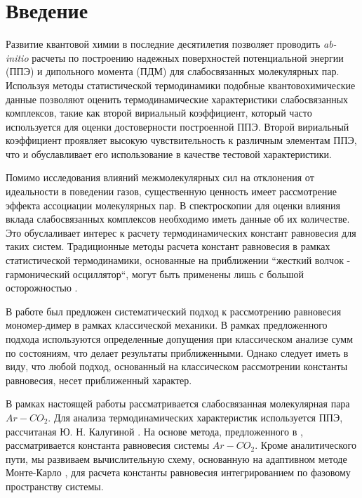 \section{Введение}
Развитие квантовой химии в последние десятилетия позволяет проводить \textit{ab-initio} расчеты по построению надежных поверхностей потенциальной энергии (ППЭ) и дипольного момента (ПДМ) для слабосвязанных молекулярных пар. Используя методы статистической термодинамики подобные квантовохимические данные позволяют оценить термодинамические характеристики слабосвязанных комплексов, такие как второй вириальный коэффициент, который часто используется для оценки достоверности построенной ППЭ. Второй вириальный коэффициент проявляет высокую чувствительность к различным элементам ППЭ, что и обуславливает его использование в качестве тестовой характеристики. \par
 Помимо исследования влияний межмолекулярных сил на отклонения от идеальности в поведении газов, существенную ценность имеет рассмотрение эффекта ассоциации молекулярных пар. В спектроскопии для оценки влияния вклада слабосвязанных комплексов необходимо иметь данные об их количестве. Это обуслаливает интерес к расчету термодинамических констант равновесия для таких систем. Традиционные методы расчета констант равновесия в рамках статистической термодинамики, основанные на приближении ``жесткий волчок - гармонический осциллятор``, могут быть применены лишь с большой осторожностью \cite{camyvigasin}. \par
В работе \cite{vigasin2015} был предложен систематический подход к рассмотрению равновесия мономер-димер в рамках классической механики. В рамках предложенного подхода используются определенные допущения при классическом анализе сумм по состояниям, что делает результаты приближенными. Однако следует иметь в виду, что любой подход, основанный на классическом рассмотрении константы равновесия, несет приближенный характер. \par
В рамках настоящей работы рассматривается слабосвязанная молекулярная пара $Ar-CO_2$. Для анализа термодинамических характеристик используется ППЭ, рассчитаная Ю. Н. Калугиной \cite{kalugina2017}. На основе метода, предложенного в \cite{vigasin2015}, рассматривается константа равновесия системы $Ar-CO_2$. Кроме аналитического пути, мы развиваем вычислительную схему, основанную на адаптивном методе Монте-Карло \cite{lepage1978, vegas}, для расчета константы равновесия интегрированием по фазовому пространству системы. 
